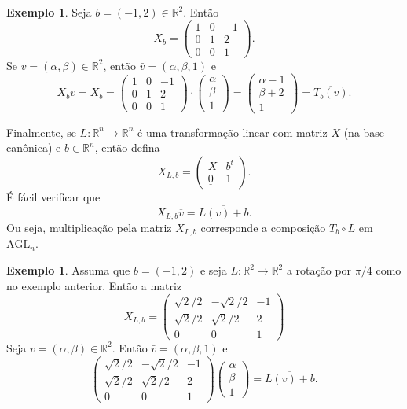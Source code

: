 \documentclass[12pt]{amsart}
\newcommand{\R}{\mathbb R}
\theoremstyle{definition}
\newtheorem{example}[theorem]{Exemplo}
\newcommand{\agl}{\mbox{AGL}}
\begin{document}
\begin{example}
    Seja $b=(-1,2)\in\R^2$.
    Então 
    \[
    X_b=\begin{pmatrix} 1 & 0 & -1 \\ 0 & 1 & 2 \\ 0 & 0 & 1\end{pmatrix}.    
    \]
    Se $v=(\alpha,\beta)\in\R^2$, então $\bar v=(\alpha,\beta,1)$ e  
    \[
        X_b\bar v=
        X_b=\begin{pmatrix} 1 & 0 & -1 \\ 0 & 1 & 2 \\ 0 & 0 & 1\end{pmatrix}
        \cdot\begin{pmatrix} \alpha \\ \beta \\ 1 \end{pmatrix}=
        \begin{pmatrix}\alpha-1 \\ \beta +2  \\ 1 \end{pmatrix}=\overline{T_b(v)}.    
    \]
\end{example}

Finalmente, se $L:\R^n\to \R^n$ é uma transformação linear com matriz $X$ (na base canônica) 
e $b\in\R^n$, então defina 
\[
    X_{L,b}=\begin{pmatrix} X & b^t\\ \underline{0} & 1\end{pmatrix}.
\]
É fácil verificar que 
\[
    X_{L,b}\overline v=\overline{L(v)+b}.
\]
Ou seja, multiplicação pela matriz $X_{L,b}$ corresponde a composição $T_b\circ L$ em $\agl_n$.

\begin{example}
    Assuma que $b=(-1,2)$ e seja $L:\R^2\to\R^2$ a rotação por $\pi/4$ como no exemplo anterior. Então a 
    matriz
    \[
        X_{L,b}=\begin{pmatrix} \sqrt 2/2 & -\sqrt 2/2 & -1 \\ \sqrt 2/2 & \sqrt 2/2 & 2 \\ 0 & 0 & 1
        \end{pmatrix}
    \]
    Seja $v=(\alpha,\beta)\in\R^2$. Então $\bar v=(\alpha,\beta,1)$ e 
    \[
        \begin{pmatrix} \sqrt 2/2 & -\sqrt 2/2 & -1 \\ \sqrt 2/2 & \sqrt 2/2 & 2 \\ 0 & 0 & 1
        \end{pmatrix}\begin{pmatrix}\alpha \\ \beta\\ 1\end{pmatrix}=
        \overline{L(v)+b}.
    \]
\end{example}
\end{document}
